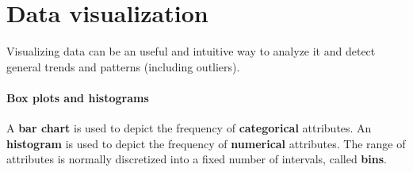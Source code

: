 
\section{Data visualization}

Visualizing data can be an useful and intuitive way to analyze it and detect general trends and patterns (including outliers).

\paragraph{Box plots and histograms}

A \textbf{bar chart} is used to depict the frequency of \textbf{categorical} attributes. An \textbf{histogram} is used to depict the frequency of \textbf{numerical} attributes. The range of attributes is normally discretized into a fixed number of intervals, called \textbf{bins}.

